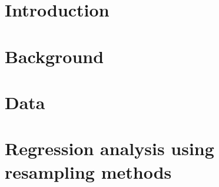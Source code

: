 % 

\section{Introduction}\label{sec:intro}





\section{Background}\label{sec:background-theory}

\newpage


\section{Data}\label{sec:data-analysis}





\section{Regression analysis using resampling methods}\label{sec:regr-analysis-boot}

\newpage

\newpage

\newpage

\newpage

\newpage

% 
% 

